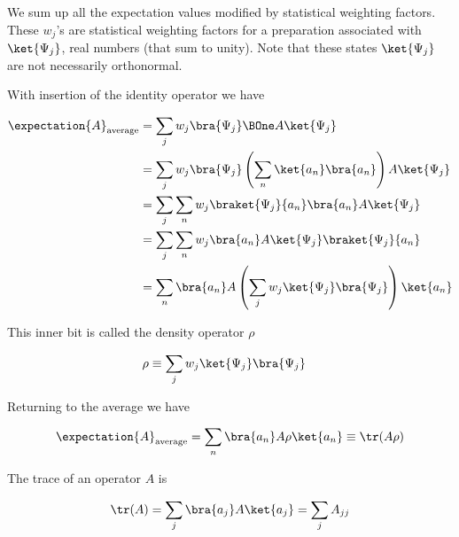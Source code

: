 We sum up all the expectation values modified by statistical weighting factors.  These $w_j$'s are statistical weighting factors for a preparation associated with $\ket{\Psi_j}$, real numbers (that sum to unity).  Note that these states $\ket{\Psi_j}$ are not necessarily orthonormal.

With insertion of the identity operator we have

\begin{equation}\label{eqn:lecture8makingSenseOfQM:1100}
\begin{aligned}
\expectation{A}_{\text{average}}
&= \sum_j w_j \bra{\Psi_j} \BOne A \ket{\Psi_j} \\
&= \sum_j w_j \bra{\Psi_j} \left( \sum_n \ket{a_n} \bra{a_n} \right) A \ket{\Psi_j} \\
&= \sum_j \sum_n w_j \braket{\Psi_j}{a_n} \bra{a_n} A \ket{\Psi_j} \\
&= \sum_j \sum_n w_j \bra{a_n} A \ket{\Psi_j} \braket{\Psi_j}{a_n}  \\
&= \sum_n \bra{a_n} A \left( \sum_j w_j \ket{\Psi_j} \bra{\Psi_j} \right) \ket{a_n}  \\
\end{aligned}
\end{equation}

This inner bit is called the density operator $\rho$

\begin{equation}\label{eqn:PHY356HNov2:40}
\begin{aligned}
\rho &\equiv \sum_j w_j \ket{\Psi_j} \bra{\Psi_j}
\end{aligned}
\end{equation}

Returning to the average we have

\begin{equation}\label{eqn:PHY356HNov2:50}
\begin{aligned}
\expectation{A}_{\text{average}} = \sum_n \bra{a_n} A \rho \ket{a_n} \equiv \tr(A \rho)
\end{aligned}
\end{equation}

The trace of an operator $A$ is

\begin{equation}\label{eqn:PHY356HNov2:60}
\begin{aligned}
\tr(A) = \sum_j \bra{a_j} A \ket{a_j} = \sum_j A_{jj}
\end{aligned}
\end{equation}


